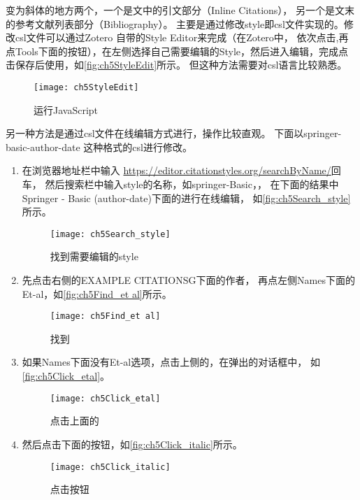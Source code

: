 \documentclass[theorem=false,mathfont=none,openany,sub3section]{easybook}
\begin{document}
{变为斜体的地方两个，一个是文中的引文部分（Inline Citations），
另一个是文末的参考文献列表部分（Bibliography）。
主要是通过修改style即csl文件实现的。修改csl文件可以通过Zotero
自带的Style Editor来完成（在Zotero中，
依次点击,再点Tools下面的按钮），在左侧选择自己需要编辑的Style，然后进入编辑，完成点击保存后使用，如\autoref{fig:ch5StyleEdit}所示。
但这种方法需要对csl语言比较熟悉。
\begin{figure}[htbp]
	\centering
	\texttt{[image: ch5StyleEdit]}
	\caption{运行JavaScript}
	\label{fig:ch5StyleEdit}
\end{figure}
另一种方法是通过csl文件在线编辑方式进行，操作比较直观。
下面以springer-basic-author-date 这种格式的csl进行修改。	
\begin{enumerate}
	\item 
	在浏览器地址栏中输入
	\href{https://editor.citationstyles.org/searchByName/}
	{https://editor.citationstyles.org/searchByName/}回车，
	然后搜索栏中输入style的名称，如springer-Basic，，
	在下面的结果中Springer - Basic (author-date)下面的进行在线编辑，
	如\autoref{fig:ch5Search_style}所示。
	\begin{figure}[htbp]
		\centering
		\texttt{[image: ch5Search\_style]}
		\caption{找到需要编辑的style}
		\label{fig:ch5Search_style}
	\end{figure}
	\item 先点击右侧的EXAMPLE CITATIONSG下面的作者，
	再点左侧Names下面的Et-al，如\autoref{fig:ch5Find_et al}所示。
	\begin{figure}[htbp]
		\centering
		\texttt{[image: ch5Find\_et al]}
		\caption{找到}
		\label{fig:ch5Find_et al}
	\end{figure}
	\item 如果Names下面没有Et-al选项，点击上侧的\menu{+}，在弹出的对话框中，
	如\autoref{fig:ch5Click_etal}。
	\begin{figure}[htbp]
		\centering
		\texttt{[image: ch5Click\_etal]}
		\caption{点击上面的\menu{+}}
		\label{fig:ch5Click_etal}
	\end{figure}
	\item 然后点击下面的按钮，如\autoref{fig:ch5Click_italic}所示。
	\begin{figure}[htbp]
		\centering
		\texttt{[image: ch5Click\_italic]}
		\caption{点击按钮}
		\label{fig:ch5Click_italic}
	\end{figure}

\end{enumerate}}
\end{document}
